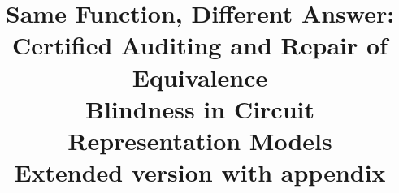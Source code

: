 \documentclass[conference]{IEEEtran}
\begin{document}
\title{Same Function, Different Answer:\\
Certified Auditing and Repair of Equivalence\\
Blindness in Circuit Representation Models\\
\large\normalfont Extended version with appendix}
\author{
}
\maketitle

\begin{abstract}

\end{abstract}



{\footnotesize

}
\clearpage

\end{document}
